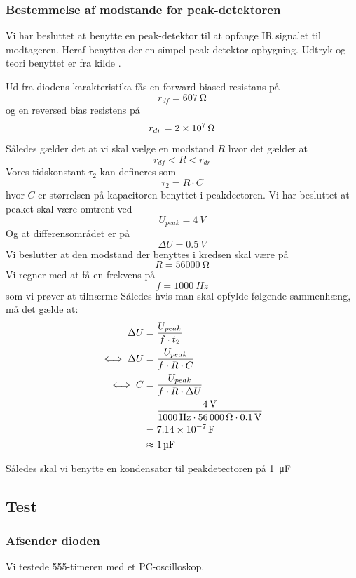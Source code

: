 \subsubsection{Bestemmelse af modstande for peak-detektoren}

Vi har besluttet at benytte en peak-detektor til at opfange IR signalet til modtageren. Heraf benyttes der en simpel peak-detektor opbygning.  Udtryk og teori benyttet er fra kilde \cite{peakdetectorCalc}.

Ud fra diodens karakteristika fås en forward-biased resistans på
\[
	r_{df} = \SI{607}{\ohm}
\]
og en reversed bias resistens på
\[
	r_{dr} = \SI{2d7}{\ohm}
\]
Således gælder det at vi skal vælge en modstand $R$ hvor det gælder at
\[
	r_{df} < R < r_{dr}
\]
Vores tidskonstant $\tau_2$ kan defineres som
\[
	\tau_2 = R \cdot C
\]
hvor $C$ er størrelsen på kapacitoren benyttet i peakdectoren.
Vi har besluttet at peaket skal være omtrent ved 
\[
	U_{peak} = \SI{4}{V}
\]
Og at differensområdet er på
\[
	\Delta U = \SI{0.5}{V}
\]
Vi beslutter at den modstand der benyttes i kredsen skal være på
\[
	R = \SI{56000}{\ohm}
\]
Vi regner med at få en frekvens på 
\[
	f= \SI{1000}{Hz}
\]
som vi prøver at tilnærme
Således hvis man skal opfylde følgende sammenhæng, må det gælde at:
\begin{align}
	\Delta U &= \frac{U_{peak}}{f \cdot t_2} \\
	\iff \Delta U &= \frac{U_{peak}}{ f \cdot R \cdot C}\\
	\iff C &= \frac{U_{peak}}{ f \cdot R \cdot \Delta U} \\
			&= \frac{\SI{4}{V}}{ \SI{1000}{Hz} \cdot \SI{56000}{\ohm} \cdot \SI{0.1}{V}} \\
			&= \SI{7.14d-7}{\farad}\\
			&\approx \SI{1}{\micro \farad}
\end{align}

Således skal vi benytte en kondensator til peakdetectoren på \SI{1}{\micro\farad}


\subsection{Test}
\subsubsection{Afsender dioden}
Vi testede 555-timeren med et PC-oscilloskop.

